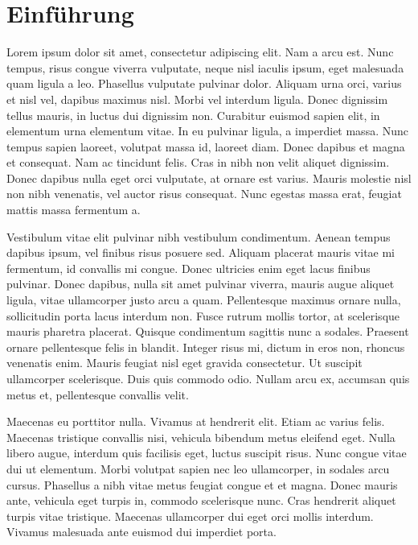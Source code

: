 \chapter{Einführung}\label{chap:intro}

Lorem ipsum dolor sit amet, consectetur adipiscing elit. Nam a arcu est. Nunc tempus, risus congue viverra vulputate, neque nisl iaculis ipsum, eget malesuada quam ligula a leo. Phasellus vulputate pulvinar dolor. Aliquam urna orci, varius et nisl vel, dapibus maximus nisl. Morbi vel interdum ligula. Donec dignissim tellus mauris, in luctus dui dignissim non. Curabitur euismod sapien elit, in elementum urna elementum vitae. In eu pulvinar ligula, a imperdiet massa. Nunc tempus sapien laoreet, volutpat massa id, laoreet diam. Donec dapibus et magna et consequat. Nam ac tincidunt felis. Cras in nibh non velit aliquet dignissim. Donec dapibus nulla eget orci vulputate, at ornare est varius. Mauris molestie nisl non nibh venenatis, vel auctor risus consequat. Nunc egestas massa erat, feugiat mattis massa fermentum a.

Vestibulum vitae elit pulvinar nibh vestibulum condimentum. Aenean tempus dapibus ipsum, vel finibus risus posuere sed. Aliquam placerat mauris vitae mi fermentum, id convallis mi congue. Donec ultricies enim eget lacus finibus pulvinar. Donec dapibus, nulla sit amet pulvinar viverra, mauris augue aliquet ligula, vitae ullamcorper justo arcu a quam. Pellentesque maximus ornare nulla, sollicitudin porta lacus interdum non. Fusce rutrum mollis tortor, at scelerisque mauris pharetra placerat. Quisque condimentum sagittis nunc a sodales. Praesent ornare pellentesque felis in blandit. Integer risus mi, dictum in eros non, rhoncus venenatis enim. Mauris feugiat nisl eget gravida consectetur. Ut suscipit ullamcorper scelerisque. Duis quis commodo odio. Nullam arcu ex, accumsan quis metus et, pellentesque convallis velit.

Maecenas eu porttitor nulla. Vivamus at hendrerit elit. Etiam ac varius felis. Maecenas tristique convallis nisi, vehicula bibendum metus eleifend eget. Nulla libero augue, interdum quis facilisis eget, luctus suscipit risus. Nunc congue vitae dui ut elementum. Morbi volutpat sapien nec leo ullamcorper, in sodales arcu cursus. Phasellus a nibh vitae metus feugiat congue et et magna. Donec mauris ante, vehicula eget turpis in, commodo scelerisque nunc. Cras hendrerit aliquet turpis vitae tristique. Maecenas ullamcorper dui eget orci mollis interdum. Vivamus malesuada ante euismod dui imperdiet porta.

